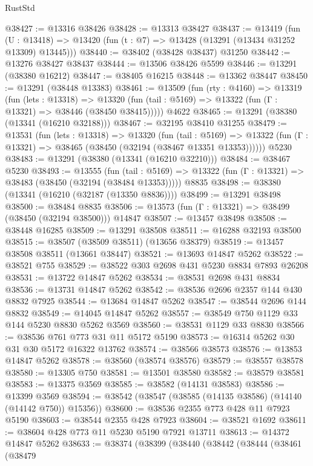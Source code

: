 \begin{lexlean}{RustStd}
\begin{coremodule}
@38427 := @13316 @38426
@38428 := @13313 @38427
@38437 := @13419
    (fun (U : @13418) => @13420 (fun (t : @7) => @13428 (@13291 (@13434 @31252 @13309) @13445)))
@38440 := @38402 (@38428 @38437) @31250
@38442 := @13276 @38427 @38437
@38444 := @13506 @38426 @5599
@38446 := @13291 (@38380 @16212)
@38447 := @38405 @16215
@38448 := @13362 @38447
@38450 := @13291 (@38448 @13383)
@38461 := @13509
    (fun (rty : @4160) =>
    @13319
      (fun (lets : @13318) =>
      @13320 (fun (tail : @5169) => @13322 (fun (Γ : @13321) => @38446 (@38450 @38415)))))
    @4622
@38465 := @13291 (@38380 (@13341 (@16210 @32188)))
@38467 := @32195 @38410 @31255
@38479 := @13531
    (fun (lets : @13318) =>
    @13320
      (fun (tail : @5169) =>
      @13322 (fun (Γ : @13321) => @38465 (@38450 (@32194 (@38467 @13351 @13353))))))
    @5230
@38483 := @13291 (@38380 (@13341 (@16210 @32210)))
@38484 := @38467 @5230
@38493 := @13555
    (fun (tail : @5169) => @13322 (fun (Γ : @13321) => @38483 (@38450 (@32194 (@38484 @13353)))))
    @8835
@38498 := @38380 (@13341 (@16210 (@32187 (@13350 @8836))))
@38499 := @13291 @38498
@38500 := @38484 @8835
@38506 := @13573 (fun (Γ : @13321) => @38499 (@38450 (@32194 @38500))) @14847
@38507 := @13457 @38498
@38508 := @38448 @16285
@38509 := @13291 @38508
@38511 := @16288 @32193 @38500
@38515 := @38507 (@38509 @38511) (@13656 @38379)
@38519 := @13457 @38508 @38511 (@13661 @38447)
@38521 := @13693 @14847 @5262
@38522 := @38521 @755
@38529 := @38522 @303 @2698 @431 @5230 @8834 @7893 @26208
@38531 := @13722 @14847 @5262
@38534 := @38531 @2698 @431 @8834
@38536 := @13731 @14847 @5262
@38542 := @38536 @2696 @2357 @144 @430 @8832 @7925
@38544 := @13684 @14847 @5262
@38547 := @38544 @2696 @144 @8832
@38549 := @14045 @14847 @5262
@38557 := @38549 @750 @1129 @33 @144 @5230 @8830 @5262 @3569
@38560 := @38531 @1129 @33 @8830
@38566 := @38536 @761 @773 @31 @11 @5172 @5190
@38573 := @16314 @5262 @30 @31 @30 @5172 @16322 @13762
@38574 := @38566 @38573
@38576 := @13853 @14847 @5262
@38578 := @38560 (@38574 @38576)
@38579 := @38557 @38578
@38580 := @13305 @750
@38581 := @13501 @38580
@38582 := @38579 @38581
@38583 := @13375 @3569
@38585 := @38582 (@14131 @38583)
@38586 := @13399 @3569
@38594 := @38542 (@38547 (@38585 (@14135 @38586) (@14140 (@14142 @750)) @15356))
@38600 := @38536 @2355 @773 @428 @11 @7923 @5190
@38603 := @38544 @2355 @428 @7923
@38604 := @38521 @1692
@38611 := @38604 @428 @773 @11 @5230 @5190 @7921 @13711
@38613 := @14372 @14847 @5262
@38633 := @38374
    (@38399
      (@38440
        (@38442
          (@38444
            (@38461
              (@38479

\end{coremodule}
\end{lexlean}

